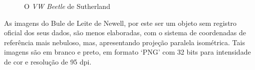 \begin{figure}[!htb]
	\centering
	\quad
	\quad
	\caption{O \textit{VW Beetle} de Sutherland}
	\label{sutherlandVWDuplo}
\end{figure}
	
	As imagens do Bule de Leite de Newell, por este ser um objeto sem registro oficial dos seus dados, são menos elaboradas, com o sistema de coordenadas de referência mais nebuloso, mas, apresentando projeção paralela isométrica. Tais imagens são em branco e preto, em formato `PNG' com 32 bits para intensidade de cor e resolução de 95 dpi.

